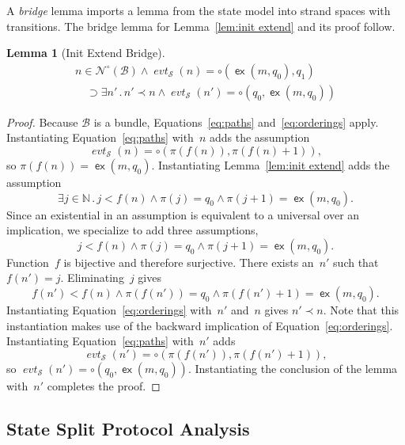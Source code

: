 \documentclass[12pt]{article}
\newtheorem{lem}[thm]{Lemma}
\newcommand{\cn}[1]{\ensuremath{\operatorname{\mathsf{#1}}}}
\newcommand{\fn}[1]{\ensuremath{\operatorname{\mathit{#1}}}}
\newcommand{\neutral}{\mathord\circ}
\newcommand{\nat}{\ensuremath{\mathbb{N}}}
\newcommand{\some}[1]{\exists#1\mathpunct.}
\newcommand{\ssp}{\ensuremath{\mathcal{S}}}
\newcommand{\bun}{\ensuremath{\mathcal{B}}}
\newcommand{\nodes}{\ensuremath{\mathcal{N}}}
\newcommand{\nnodes}{\nodes^{\neutral}}
\newcommand{\extend}{\cn{ex}}
\newcommand{\pth}{\ensuremath{\pi}}
\newcommand{\evt}{\fn{evt}}
\begin{document}
A \emph{bridge} lemma imports a lemma from the state model into strand
spaces with transitions.  The bridge lemma for Lemma~\ref{lem:init
  extend} and its proof follow.


\begin{lem}[Init Extend Bridge]\label{lem:init extend bridge}
\[
\begin{array}{l}
  n\in\nnodes(\bun)\land\evt_\ssp(n)=\neutral(\extend(m,q_0),q_1)\\
  \quad\supset\some{n'}n'\prec n\land
  \evt_\ssp(n')=\neutral(q_0,\extend(m,q_0))
\end{array}
\]
\end{lem}
\begin{proof}
  Because {\bun} is a bundle, Equations~\ref{eq:paths}
  and~\ref{eq:orderings} apply.  Instantiating Equation~\ref{eq:paths}
  with~$n$ adds the assumption
  \[\evt_\ssp(n)=\neutral(\pth(f(n)), \pth(f(n)+1)),\]
  so $\pth(f(n))=\extend(m,q_0)$.
  Instantiating Lemma~\ref{lem:init extend} adds the assumption
  \[\some{j\in\nat}j<f(n)\land\pth(j)=q_0\land\pth(j+1)=\extend(m,q_0).\]
  Since an existential in an assumption is equivalent to a universal
  over an implication, we specialize to add three assumptions,
  \[j<f(n)\land\pth(j)=q_0\land\pth(j+1)=\extend(m,q_0).\]
  Function~$f$ is bijective and therefore surjective.  There exists
  an~$n'$ such that $f(n')=j$.  Eliminating~$j$ gives
  \[f(n')<f(n)\land\pth(f(n'))=q_0\land\pth(f(n')+1)=\extend(m,q_0).\]
  Instantiating Equation~\ref{eq:orderings} with~$n'$ and~$n$ gives
  $n'\prec n$.  Note that this instantiation makes use of the backward
  implication of Equation~\ref{eq:orderings}.  Instantiating
  Equation~\ref{eq:paths} with~$n'$ adds
  \[\evt_\ssp(n')=\neutral(\pth(f(n')), \pth(f(n')+1)),\]
  so $\evt_\ssp(n')=\neutral(q_0,\extend(m,q_0))$.  Instantiating the
  conclusion of the lemma with~$n'$ completes the proof.
\end{proof}

\subsection{State Split Protocol Analysis}\label{sec:state split}
\end{document}
